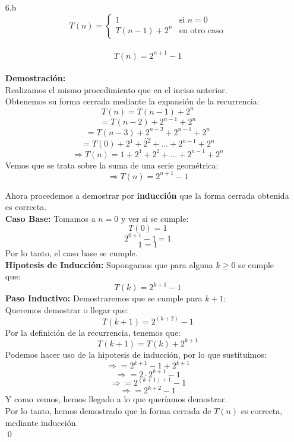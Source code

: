 \documentclass[12pt]{article}
\begin{document}
\begin{itemize}
    \item[6.b]
    \[
        T(n) = \left\{ \begin{array}{ll}
        1 & \text{si } n=0\\ T(n-1)+2^n & \text{en otro caso} \end{array}\right.
    \]
    \\
    \[
        T(n) = 2^{n+1}-1
    \]
    \\\textbf{Demostración:}\\
    Realizamos el mismo procedimiento que en el inciso anterior.\\
    Obtenemos su forma cerrada mediante la expansión de la recurrencia:
    \[
        T(n) = T(n-1) + 2^n 
    \]
    \[
        = T(n-2) + 2^{n-1} + 2^n
    \]
    \[
        = T(n-3) + 2^{n-2} + 2^{n-1} + 2^n
    \]
    \[
        ...
    \]
    \[
        = T(0) + 2^1 + 2^2 + ... + 2^{n-1} + 2^n
    \]
    \[
    \Rightarrow T(n) = 1 + 2^1 + 2^2 + ... + 2^{n-1} + 2^n
    \]
    Vemos que se trata sobre la suma de una serie geométrica:
    \[    
    \Rightarrow T(n) = 2^{n+1} - 1
    \]

    Ahora procedemos a demostrar por \textbf{inducción} que la forma cerrada obtenida es correcta.\\
    \textbf{Caso Base:} Tomamos a $n = 0$ y ver si se cumple:
    \[
        T(0) = 1
    \]
    \[
        2^{0+1} - 1 = 1
    \]
    \[
        1 = 1
    \]
    Por lo tanto, el caso base se cumple.\\
    \textbf{Hipotesis de Inducción:} Supongamos que para alguna $k \geq 0$ se cumple que:
    \[
        T(k) = 2^{k+1} - 1
    \]
    \textbf{Paso Inductivo:} Demostraremos que se cumple para $k + 1$:\\
    Queremos demostrar o llegar que: 
    \[
        T(k+1) = 2^{(k+2)} - 1
    \]
    Por la definición de la recurrencia, tenemos que:
    \[
        T(k+1) = T(k) + 2^{k + 1}
    \]
    Podemos hacer uso de la hipotesis de inducción, por lo que sustituimos:
    \[
    \Rightarrow = 2^{k+1} - 1 +
        2^{k + 1}
    \]
    \[        \Rightarrow = 2 \cdot 2^{k+1} - 1
    \]
    \[        \Rightarrow = 2^{(k+1)+1} - 1
    \]
    \[        \Rightarrow = 2^{k+2} - 1
    \]
    Y como vemos, hemos llegado a lo que queríamos demostrar.\\
    Por lo tanto, hemos demostrado que la forma cerrada de $T(n)$ es correcta, mediante inducción.\\
    \qed



\end{itemize}
\end{document}
